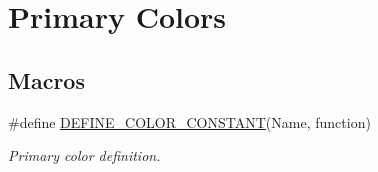 \hypertarget{group___primary_colors}{\section{Primary Colors}
\label{group___primary_colors}
}
\subsection*{Macros}
\begin{DoxyCompactItemize}
\item 
\#define \hyperlink{group___primary_colors_ga372b1b173b9a8fcb12af311790630867}{D\-E\-F\-I\-N\-E\-\_\-\-C\-O\-L\-O\-R\-\_\-\-C\-O\-N\-S\-T\-A\-N\-T}(Name, function)
\begin{DoxyCompactList}\small\item\em Primary color definition. \end{DoxyCompactList}\end{DoxyCompactItemize}
